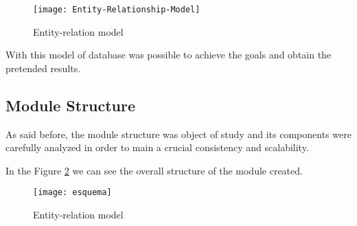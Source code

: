 \begin{figure}[h]
	\begin{center}
		\leavevmode
		\texttt{[image: Entity-Relationship-Model]}
		\caption{Entity-relation model}
		\label{fig:entity-relation}
	\end{center}
\end{figure}

With this model of database was possible to achieve the goals and obtain the pretended results.

\subsection{Module Structure}

As said before, the module structure was object of study and its components were carefully analyzed in order to main a crucial consistency and scalability.

In the Figure \ref{fig:esquema} we can see the overall structure of the module created.


\begin{landscape}
\begin{figure}[h]
	\begin{center}
		\leavevmode
		\texttt{[image: esquema]}
		\caption{Entity-relation model}
		\label{fig:esquema}
	\end{center}
\end{figure}
\end{landscape}

